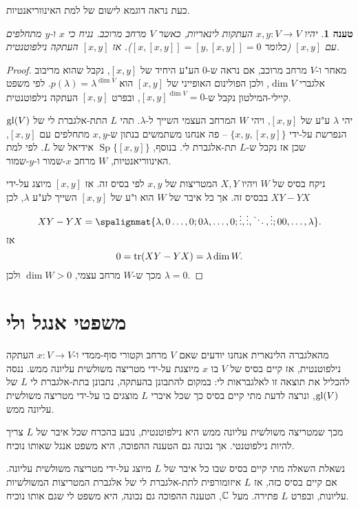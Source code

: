 \documentclass{report}
\theoremstyle{break}
\newtheorem{preposition}[preposition]{טענה}
\theoremstyle{MyNonumberbreak}
\newtheorem{proof}{הוכחה}
\DeclareMathOperator{\Sp}{Sp}
\begin{document}
כעת נראה דוגמא לישום של למת האינווריאנטיות.
\begin{preposition}
	יהיו $x, y : V \to V$ העתקות לינאריות, כאשר $V$ מרחב מרוכב. נניח כי $x$ ו-$y$ מתחלפים עם $[x, y]$ (כלומר $[x, [x, y]] = [y, [x, y]] = 0$). אז $[x, y]$ העתקה נילפוטנטית.
\end{preposition}
\begin{proof}
	מאחר ו-$V$ מרחב מרוכב, אם נראה ש-$0$ הע"ע היחיד של $[x, y]$, נקבל שהוא מריבוב אלגברי $\dim V$, ולכן הפולינום האופייני של $[x, y]$ הוא $p(\lambda) = \lambda^{\dim V}$. לפי משפט קיילי-המילטון נקבל ש-$[x, y]^{\dim V} = 0$, ובפרט $[x, y]$ העתקה נילפוטנטית.
	
	יהי $\lambda$ ע"ע של $[x, y]$, ויהי $W$ המרחב העצמי השייך ל-$\lambda$. תהי $L$ התת-אלגברת לי של $\operatorname{gl}(V)$ הנפרשת על-ידי $\{x, y, [x, y]\}$ -- פה אנחנו משתמשים בנתון ש-$x, y$ מתחלפים עם $[x, y]$, שכן אז נקבל ש-$L$ תת-אלגברת לי. בנוסף, $\Sp\{[x, y]\}$ אידיאל של $L$. לפי למת האינווריאנטיות, $W$ מרחב $x$-שמור ו-$y$-שמור.
	
	ניקח בסיס של $W$ ויהיו $X, Y$ המטריצות של $x, y$ לפי בסיס זה. אז $[x, y]$ מיוצג על-ידי $XY - YX$ בבסיס זה. אך כל איבר של $W$ הוא ו"ע של $[x, y]$ השייך לע"ע $\lambda$, לכן
	\[ XY - YX = \spalignmat{\lambda, 0 \ldots, 0 ; 0 \lambda, \ldots, 0 ; \vdots, \vdots, \ddots, \vdots ; 0 0, \ldots, \lambda}. \]
	אז
	\[ 0 = \operatorname{tr}(XY - YX) = \lambda \dim W. \]
	מכך ש-$W$ מרחב עצמי, $\dim W > 0$ ולכן $\lambda = 0$.
\end{proof}


\chapter{משפטי אנגל ולי}
מהאלגברה הלינארית אנחנו יודעים שאם $V$ מרחב וקטורי סוף-ממדי ו-$x : V \to V$ העתקה נילפוטנטית, אז קיים בסיס של $V$ בו $x$ מיוצגת על-ידי מטריצה משולשית עליונה ממש. ננסה להכליל את תוצאה זו לאלגבראות לי: במקום להתבונן בהעתקה, נתבונן בתת-אלגברת לי $L$ של $\operatorname{gl}(V)$, ונרצה לדעת מתי קיים בסיס כך שכל איברי $L$ מוצגים בו על-ידי מטריצה משולשית עליונה ממש.

מכך שמטריצה משולשית עליונה ממש היא נילפוטנטית, נובע בהכרח שכל איבר של $L$ צריך להיות נילפוטנטי. אך נכונה גם הטענה ההפוכה, היא משפט אנגל שאותו נוכיח.

נשאלת השאלה מתי קיים בסיס שבו כל איבר של $L$ מיוצג על-ידי מטריצה משולשית עליונה. אם קיים בסיס כזה, אז $L$ איזומורפית לתת-אלגברת לי של אלגברת המטריצות המשולשיות עליונות, ובפרט $L$ פתירה. מעל $\operatorname{\mathbb{C}}$, הטענה ההפוכה גם נכונה, היא משפט לי שגם אותו נוכיח.
\end{document}
